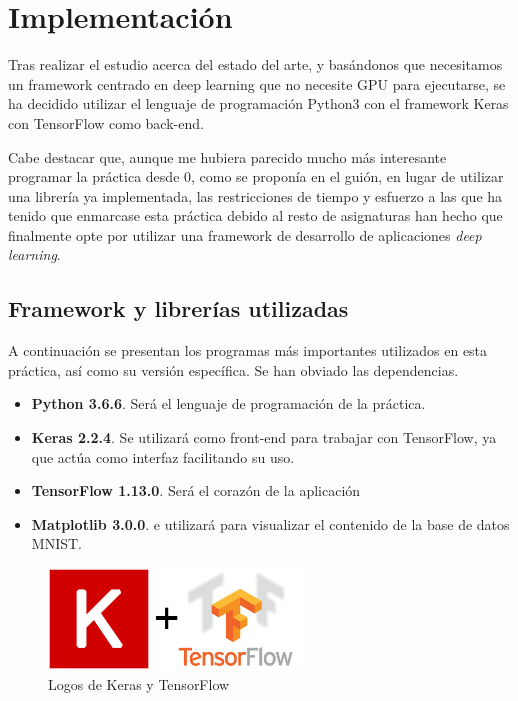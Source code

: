 \chapter{Implementación}
\label{chap:impl}

Tras realizar el estudio acerca del estado del arte, y basándonos que necesitamos un framework centrado en deep learning que no necesite GPU para ejecutarse, se ha decidido utilizar el lenguaje de programación Python3 con el framework Keras con TensorFlow como back-end.

\bigskip

Cabe destacar que, aunque me hubiera parecido mucho más interesante programar la práctica desde 0, como se proponía en el guión, en lugar de utilizar una librería ya implementada, las restricciones de tiempo y esfuerzo a las que ha tenido que enmarcase esta práctica debido al resto de asignaturas han hecho que finalmente opte por utilizar una framework de desarrollo de aplicaciones \textit{deep learning}.

\section{Framework y librerías utilizadas}

A continuación se presentan los programas más importantes utilizados en esta práctica, así como su versión específica. Se han obviado las dependencias.

\begin{itemize}
  \item \textbf{Python 3.6.6}. Será el lenguaje de programación de la práctica.
  \item \textbf{Keras 2.2.4}. Se utilizará como front-end para trabajar con TensorFlow, ya que actúa como interfaz facilitando su uso.
  \item \textbf{TensorFlow 1.13.0}. Será el corazón de la aplicación
  \item \textbf{Matplotlib 3.0.0}. e utilizará para visualizar el contenido de la base de datos MNIST.
\end{itemize}

\bigskip

\begin{figure}[H]
  \centering
  \includegraphics[width=0.6\textwidth]{../images/keras-ts}
  \caption{Logos de Keras y TensorFlow}
  \label{fig:logos-keras-ts}
\end{figure}

